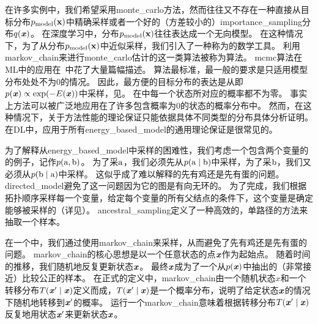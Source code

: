 在许多实例中，我们希望采用\gls{monte_carlo}方法，然而往往又不存在一种直接从目标分布$p_{\text{model}}(\mathbf{x})$中精确采样或者一个好的（方差较小的）\gls{importance_sampling}分布$q(\boldsymbol{\mathit{x}})$。   %
在深度学习中，分布$p_{\text{model}}(\mathbf{x})$往往表达成一个无向模型。 %
在这种情况下，为了从分布$p_{\text{model}}(\mathbf{x})$中近似采样，我们引入了一种称为的数学工具。
利用\gls{markov_chain}来进行\gls{monte_carlo}估计的这一类算法被称为算法。
\gls{mcmc}算法在\gls{ML}中的应用在~\citet{koller-book2009}中花了大量篇幅描述。
算法最标准，最一般的要求是只适用模型分布处处不为$0$的情况。
因此，最方便的目标分布的表达是从即$p(\boldsymbol{\mathit{x}})\propto \exp(-E(\boldsymbol{\mathit{x}}))$中采样，见。
在中每一个状态所对应的概率都不为零。
事实上方法可以被广泛地应用在了许多包含概率为$0$的状态的概率分布中。%
然而，在这种情况下，关于方法性能的理论保证只能依据具体不同类型的分布具体分析证明。
在\gls{DL}中，应用于所有\gls{energy_based_model}的通用理论保证是很常见的。


为了解释从\gls{energy_based_model}中采样的困难性，我们考虑一个包含两个变量的的例子，记作$p(\mathrm{a},\mathrm{b})$。  %
为了采$\mathrm{a}$，我们必须先从$p(\mathrm{a}\mid \mathrm{b})$中采样，为了采$\mathrm{b}$，我们又必须从$p(\mathrm{b}\mid \mathrm{a})$中采样。   %
这似乎成了难以解释的先有鸡还是先有蛋的问题。
\gls{directed_model}避免了这一问题因为它的图是有向无环的。
为了完成，我们根据拓扑顺序采样每一个变量，给定每个变量的所有父结点的条件下，这个变量是确定能够被采样的（详见）。   
\gls{ancestral_sampling}定义了一种高效的，单路径的方法来抽取一个样本。   


在一个中，我们通过使用\gls{markov_chain}来采样，从而避免了先有鸡还是先有蛋的问题。  %
\gls{markov_chain}的核心思想是以一个任意状态的点$\boldsymbol{\mathit{x}}$作为起始点。
随着时间的推移，我们随机地反复更新状态$\boldsymbol{\mathit{x}}$。  
最终$\boldsymbol{\mathit{x}}$成为了一个从$p(\boldsymbol{\mathit{x}})$中抽出的（非常接近）比较公正的样本。  %
在正式的定义中，\gls{markov_chain}由一个随机状态$x$和一个转移分布$T(\boldsymbol{\mathit{x}}'\mid \boldsymbol{\mathit{x}})$定义而成，$T(\boldsymbol{\mathit{x}}'\mid \boldsymbol{\mathit{x}})$是一个概率分布，说明了给定状态$\boldsymbol{\mathit{x}}$的情况下随机地转移到$\boldsymbol{\mathit{x}}'$的概率。
运行一个\gls{markov_chain}意味着根据转移分布$T(\boldsymbol{\mathit{x}}'\mid \boldsymbol{\mathit{x}})$反复地用状态$\boldsymbol{\mathit{x}}'$来更新状态$\boldsymbol{\mathit{x}}$。  


